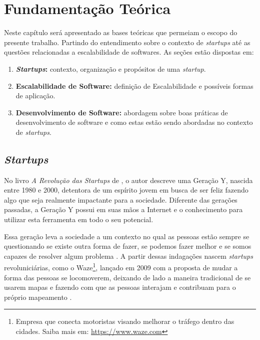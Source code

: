 \chapter[Fundamentação Teórica]{Fundamentação Teórica}

Neste capítulo será apresentado as bases teóricas que permeiam o escopo
do presente trabalho. Partindo do entendimento sobre o contexto de
\textit{startups} até as questões relacionadas a escalabilidade de softwares.
As seções estão dispostas em:

  \begin{enumerate}
    \item \textbf{\textit{Startups}:} contexto, organização e propósitos de uma 
      \textit{startup}.
    \item \textbf{Escalabilidade de Software:} definição de Escalabilidade e 
      possíveis formas de aplicação.
    \item \textbf{Desenvolvimento de Software:} abordagem sobre boas práticas
    de desenvolvimento de software e como estas estão sendo abordadas no contexto
    de \textit{startups}.
  \end{enumerate}

\section{\textit{Startups}}

No livro \textit{A Revolução das Startups} de ,
o autor descreve uma Geração Y, nascida entre 1980 e 2000, detentora de um
espírito jovem em busca de ser feliz fazendo algo que seja realmente
impactante para a sociedade. Diferente das gerações passadas, a Geração Y
possui em suas mãos a Internet e o conhecimento para utilizar esta
ferramenta em todo o seu potencial.

Essa geração leva a sociedade a um contexto no qual as pessoas estão sempre
se questionando se existe outra forma de fazer, se podemos fazer melhor e
se somos capazes de resolver algum problema \cite{ARevolucaoDasStartups}.
A partir dessas indagações nascem \textit{startups} revoluniciárias, como
o Waze\footnote{Empresa que conecta motoristas visando melhorar o tráfego
dentro das cidades. Saiba mais em: \url{https://www.waze.com}}, lançado em
2009 com a proposta de mudar a forma das pessoas se locomoverem, deixando 
de lado a maneira tradicional de se usarem mapas e fazendo com que as 
pessoas interajam e contribuam para o próprio mapeamento
\cite{NepomucenoSucessoDoWaze}.

